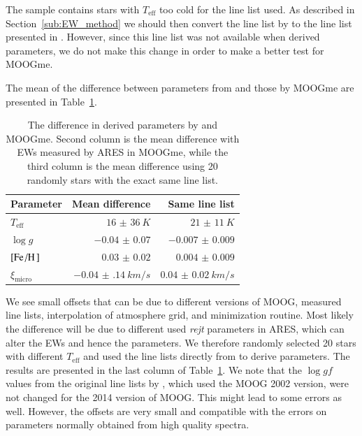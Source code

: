 \documentclass{aa}
\begin{document}
The sample contains stars with $T_\mathrm{eff}$ too cold for the line list used.
As described in Section~\ref{sub:EW_method} we should then convert the line list
by \citet{Sousa2008a} to the line list presented in \citet{Tsantaki2013}.
However, since this line list was not available when \citet{Sousa2011} derived
parameters, we do not make this change in order to make a better test for
MOOGme.

The mean of the difference between parameters from \citet{Sousa2011} and those
by MOOGme are presented in Table~\ref{tab:MOOGmeTest}.

\begin{table}[htb!]
    \caption{The difference in derived parameters by \citet{Sousa2011}
    and MOOGme. Second column is the mean difference with EWs measured by
    ARES in MOOGme, while the third column is the mean difference using
    20 randomly stars with the exact same line list.}
    \label{tab:MOOGmeTest}
    \centering
    \begin{tabular}{lrr}
      \hline\hline
      Parameter             &  Mean difference         & Same line list        \\
      \hline
      $T_\mathrm{eff}$      &  $\SI{16(36)}{K}$        & $\SI{21(11)}{K}$      \\
      $\log g$              &  $\num{-0.04(7)}$        & $\num{-0.007(9)}$     \\
      $[\ion{Fe}/\ion{H}]$  &  $\num{0.03(2)}$         & $\num{0.004(9)}$      \\
      $\xi_\mathrm{micro}$  &  $\SI{-0.04(14)}{km/s}$  & $\SI{0.04(2)}{km/s}$  \\
      \hline
    \end{tabular}
\end{table}

We see small offsets that can be due to different versions of MOOG, measured
line lists, interpolation of atmosphere grid, and minimization routine. Most
likely the difference will be due to different used \emph{rejt} parameters in
ARES, which can alter the EWs and hence the parameters. We therefore randomly
selected 20 stars with different $T_\mathrm{eff}$ and used the line lists
directly from \citet{Sousa2011} to derive parameters. The results are presented
in the last column of Table~\ref{tab:MOOGmeTest}. We note that the $\log gf$
values from the original line lists by \citet{Sousa2011}, which used the MOOG
2002 version, were not changed for the 2014 version of MOOG. This might lead to
some errors as well. However, the offsets are very small and compatible with the
errors on parameters normally obtained from high quality spectra.
\end{document}
